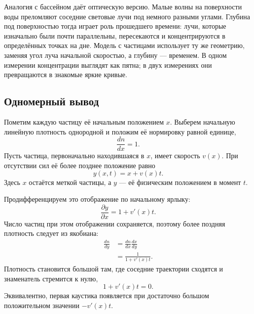 Аналогия с бассейном даёт оптическую версию. Малые волны на поверхности воды преломляют соседние световые лучи под немного разными углами. Глубина под поверхностью тогда играет роль прошедшего времени: лучи, которые изначально были почти параллельны, пересекаются и концентрируются в определённых точках на дне. Модель с частицами использует ту же геометрию, заменяя угол луча начальной скоростью, а глубину — временем. В одном измерении концентрации выглядят как пятна; в двух измерениях они превращаются в знакомые яркие кривые.

\subsection{Одномерный вывод}

Пометим каждую частицу её начальным положением \(x\). Выберем начальную линейную плотность однородной и положим её нормировку равной единице,
\begin{equation}
\frac{dn}{dx}=1.
\label{eq:c09-initial-density}
\end{equation}
Пусть частица, первоначально находившаяся в \(x\), имеет скорость \(v(x)\). При отсутствии сил её более позднее положение равно
\begin{equation}
y(x,t)=x+v(x)t.
\label{eq:c09-ballistic-map}
\end{equation}
Здесь \(x\) остаётся меткой частицы, а \(y\) — её физическим положением в момент \(t\).

Продифференцируем это отображение по начальному ярлыку:
\begin{equation}
\frac{\partial y}{\partial x}
=1+v'(x)t.
\label{eq:c09-jacobian}
\end{equation}
Число частиц при этом отображении сохраняется, поэтому более поздняя плотность следует из якобиана:
\begin{align}
\frac{dn}{dy}
&=
\frac{dn}{dx}\frac{dx}{dy}\\
&=
\frac{1}{1+v'(x)t}.
\label{eq:c09-caustic-density}
\end{align}
Плотность становится большой там, где соседние траектории сходятся и знаменатель стремится к нулю,
\begin{equation}
1+v'(x)t=0.
\label{eq:c09-caustic-condition}
\end{equation}
Эквивалентно, первая каустика появляется при достаточно большом положительном значении \(-v'(x)t\).

